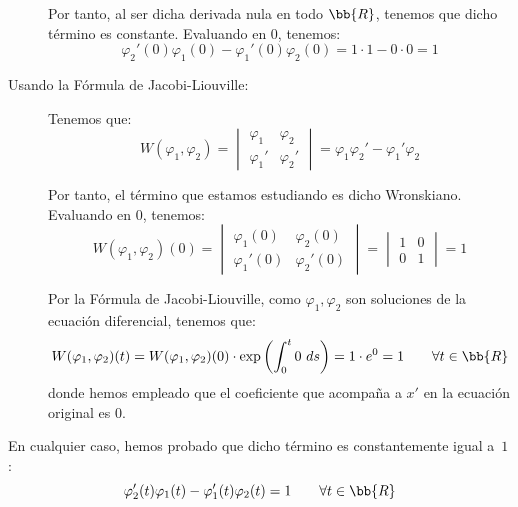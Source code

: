 \documentclass[12pt]{article}
\begin{document}
\begin{ejercicio}
\begin{description}
            Por tanto, al ser dicha derivada nula en todo $\bb{R}$, tenemos que dicho término es constante. Evaluando en $0$, tenemos:
            \begin{equation*}
                \varphi_2'(0)\varphi_1(0)-\varphi_1'(0)\varphi_2(0)
                =1\cdot 1-0\cdot 0=1
            \end{equation*}

            \item[Usando la Fórmula de Jacobi-Liouville:]
            
            Tenemos que:
            \begin{equation*}
                W(\varphi_1,\varphi_2)=\begin{vmatrix}
                    \varphi_1& \varphi_2\\
                    \varphi_1' & \varphi_2'
                \end{vmatrix}
                = \varphi_1\varphi_2'-\varphi_1'\varphi_2
            \end{equation*}

            Por tanto, el término que estamos estudiando es dicho Wronskiano.
            Evaluando en $0$, tenemos:
            \begin{equation*}
                W(\varphi_1,\varphi_2)(0)=\begin{vmatrix}
                    \varphi_1(0) & \varphi_2(0)\\
                    \varphi_1'(0) & \varphi_2'(0)
                \end{vmatrix}
                = \begin{vmatrix}
                    1 & 0\\
                    0 & 1
                \end{vmatrix} = 1
            \end{equation*}

            Por la Fórmula de Jacobi-Liouville, como $\varphi_1,\varphi_2$ son soluciones de la ecuación diferencial, tenemos que:
            \begin{equation*}
                W(\varphi_1,\varphi_2)(t)=W(\varphi_1,\varphi_2)(0)\cdot \exp\left(\int_0^t 0~ds\right)=1\cdot e^0=1\qquad \forall t\in \bb{R}
            \end{equation*}
            donde hemos empleado que el coeficiente que acompaña a $x'$ en la ecuación original es $0$.
        \end{description}

        En cualquier caso, hemos probado que dicho término es constantemente igual a~$1$:
        \begin{equation*}
            \varphi_2'(t)\varphi_1(t)-\varphi_1'(t)\varphi_2(t)
            = 1\qquad \forall t\in \bb{R}
        \end{equation*}


\end{ejercicio}
\end{document}
